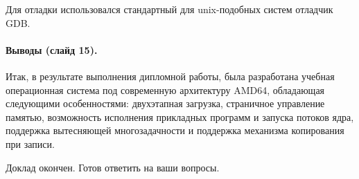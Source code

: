 \documentclass[12pt]{article}
\begin{document}
Для отладки использовался стандартный для unix-подобных систем отладчик GDB.

\paragraph{Выводы (слайд 15).}
Итак, в результате выполнения дипломной работы, была разработана учебная операционная
система под современную архитектуру AMD64, обладающая следующими особенностями:
двухэтапная загрузка, страничное управление памятью, возможность исполнения прикладных
программ и запуска потоков ядра, поддержка вытесняющей многозадачности и поддержка
механизма копирования при записи.

Доклад окончен. Готов ответить на ваши вопросы.
\end{document}
